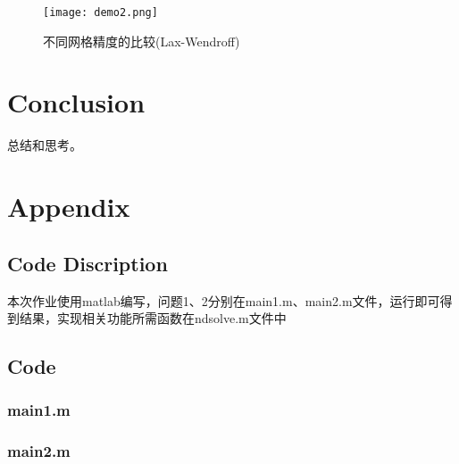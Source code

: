 \documentclass{article}
\begin{document}
\begin{figure}[H]
    \centering
    \texttt{[image: demo2.png]}
    \caption{不同网格精度的比较(Lax-Wendroff)}\label{fig:demo2}
\end{figure}

\section{Conclusion}

总结和思考。

\section{Appendix}
\subsection{Code Discription}
本次作业使用matlab编写，问题1、2分别在main1.m、main2.m文件，运行即可得到结果，实现相关功能所需函数在ndsolve.m文件中
\subsection{Code}
\subsubsection{main1.m}

\subsubsection{main2.m}


\end{document}
